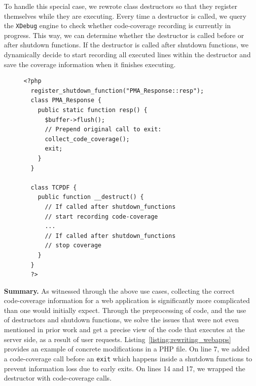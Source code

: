 To handle this special case, we rewrote class destructors so that they
register themselves while they are executing. Every time a destructor
is called, we query the \texttt{XDebug} engine to check whether code-coverage
recording is currently in progress. This way, we can determine whether the
destructor is called before or after shutdown functions. If the destructor
is called after shutdown functions, we dynamically decide to start recording
all executed lines within the destructor and save the coverage information
when it finishes executing.


\begin{figure}[t]
  \begin{lstlisting}[frame=single, caption={Code rewritten by the debloating framework to ensure correct code-coverage of corner cases.},captionpos=b, label={listing:rewriting_webapps}]
  <?php
  register_shutdown_function("PMA_Response::resp");
  class PMA_Response {
    public static function resp() {
      $buffer->flush();
      // Prepend original call to exit:
      collect_code_coverage();
      exit;
    }
  }
  
  class TCPDF {
    public function __destruct() {
      // If called after shutdown_functions
      // start recording code-coverage
      ...
      // If called after shutdown_functions
      // stop coverage
    }
  }
  ?>
  \end{lstlisting}
\end{figure}

\vspace{1ex}
\noindent\textbf{Summary.}
As witnessed through the above use cases, collecting the correct code-coverage information
for a web application is significantly more complicated than one would
initially expect. Through the preprocessing of code, and the use of destructors
and shutdown functions, we solve the issues that were not even mentioned
in prior work and get a precise view of the code that executes at the server
side, as a result of user requests. Listing~\ref{listing:rewriting_webapps}
provides an example of concrete modifications in a PHP file. On line 7, we
added a code-coverage call before an \texttt{exit} which happens inside a shutdown functions to prevent information
loss due to early exits. On lines 14 and 17, we wrapped the destructor with
code-coverage calls.


